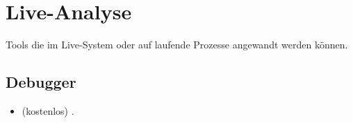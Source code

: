 \section{Live-Analyse}

Tools die im Live-System oder auf laufende Prozesse angewandt werden können.

\subsection{Debugger}

\myindex{\olly}

\begin{itemize}
\item (kostenlos) .
%
%
%
%
%
%
%
%
\end{itemize}

